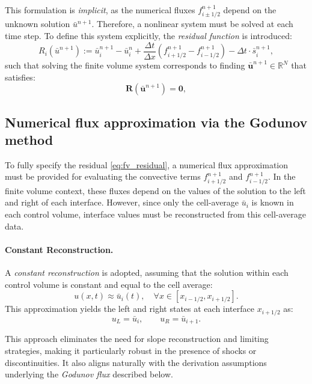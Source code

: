 This formulation is \textit{implicit}, as the numerical fluxes \( f_{i\pm1/2}^{n+1} \) depend on the unknown solution \( \bar{u}^{n+1} \). Therefore, a nonlinear system must be solved at each time step. To define this system explicitly, the \textit{residual function} is introduced:
\begin{equation}
R_i\left( \bar{u}^{n+1} \right) := 
\bar{u}_i^{n+1} - \bar{u}_i^n 
+ \frac{\Delta t}{\Delta x} \left( f_{i+1/2}^{n+1} - f_{i-1/2}^{n+1} \right) 
- \Delta t \cdot \bar{s}_i^{n+1},
\label{eq:fv_residual}
\end{equation}
such that solving the finite volume system corresponds to finding \( \bar{\mathbf{u}}^{n+1} \in \mathbb{R}^N \) that satisfies:
\begin{equation}
\mathbf{R}(\bar{\mathbf{u}}^{n+1}) = \mathbf{0},
\label{eq:residual_fv}
\end{equation}

\subsection{Numerical flux approximation via the Godunov method}

To fully specify the residual \eqref{eq:fv_residual}, a numerical flux approximation must be provided for evaluating the convective terms \( f_{i+1/2}^{n+1} \) and \( f_{i-1/2}^{n+1} \). In the finite volume context, these fluxes depend on the values of the solution to the left and right of each interface. However, since only the cell-average \( \bar{u}_i \) is known in each control volume, interface values must be reconstructed from this cell-average data.

\paragraph{Constant Reconstruction.} A \textit{constant reconstruction} is adopted, assuming that the solution within each control volume is constant and equal to the cell average:
\[
u(x,t) \approx \bar{u}_i(t), \quad \forall x \in [x_{i-1/2}, x_{i+1/2}].
\]
This approximation yields the left and right states at each interface \( x_{i+1/2} \) as:
\[
u_L = \bar{u}_i, \qquad u_R = \bar{u}_{i+1}.
\]

This approach eliminates the need for slope reconstruction and limiting strategies, making it particularly robust in the presence of shocks or discontinuities. It also aligns naturally with the derivation assumptions underlying the \textit{Godunov flux} described below.

